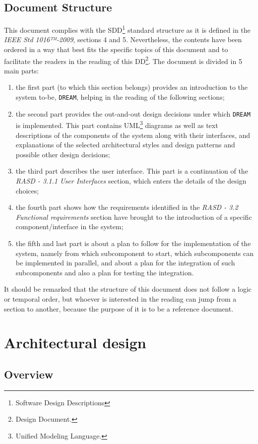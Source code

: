 \documentclass{article}
\begin{document}
\subsection{Document Structure}
This document complies with the SDD\footnote{Software Design Descriptions} standard structure as it is defined in the \textit{IEEE Std 1016™-2009}, sections 4 and 5. Nevertheless, the contents have been ordered in a way that best fits the specific topics of this document and to facilitate the readers in the reading of this DD\footnote{Design Document.}.
The document is divided in 5 main parts:
\begin{enumerate}
\item the first part (to which this section belongs) provides an introduction to the system to-be, \verb|DREAM|, helping in the reading of the following sections;
\item the second part provides the out-and-out design decisions under which \verb|DREAM| is implemented. This part contains UML\footnote{Unified Modeling Language.} diagrams as well as text descriptions of the components of the system along with their interfaces, and explanations of the selected architectural styles and design patterns and possible other design decisions;
\item the third part describes the user interface. This part is a continuation of the \textit{RASD - 3.1.1 User Interfaces} section, which enters the details of the design choices;
\item the fourth part shows how the requirements identified in the \textit{RASD - 3.2 Functional requirements} section have brought to the introduction of a specific component/interface in the system;
\item the fifth and last part is about a plan to follow for the implementation of the system, namely from which subcomponent to start, which subcomponents can be implemented in parallel, and about a plan for the integration of such subcomponents and also a plan for testing the integration.
\end{enumerate}
It should be remarked that the structure of this document does not follow a logic or temporal order, but whoever is interested in the reading can jump from a section to another, because the purpose of it is to be a reference document.
\section{Architectural design}
\subsection{Overview}
\end{document}
